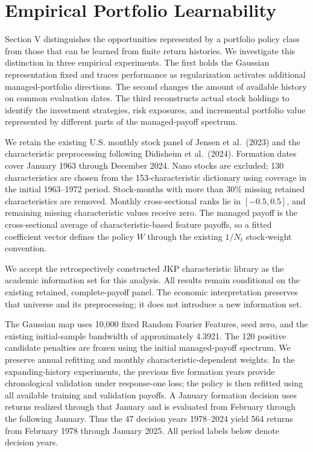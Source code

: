 \documentclass[12pt,letterpaper]{article}
\begin{document}
\section{Empirical Portfolio Learnability}

Section V distinguishes the opportunities represented by a portfolio policy class from those that can be learned from finite return histories. We investigate this distinction in three empirical experiments. The first holds the Gaussian representation fixed and traces performance as regularization activates additional managed-portfolio directions. The second changes the amount of available history on common evaluation dates. The third reconstructs actual stock holdings to identify the investment strategies, risk exposures, and incremental portfolio value represented by different parts of the managed-payoff spectrum.

We retain the existing U.S. monthly stock panel of Jensen et al.\ (2023) and the characteristic preprocessing following Didisheim et al.\ (2024). Formation dates cover January 1963 through December 2024. Nano stocks are excluded; 130 characteristics are chosen from the 153-characteristic dictionary using coverage in the initial 1963--1972 period. Stock-months with more than 30\% missing retained characteristics are removed. Monthly cross-sectional ranks lie in $[-0.5,0.5]$, and remaining missing characteristic values receive zero. The managed payoff is the cross-sectional average of characteristic-based feature payoffs, so a fitted coefficient vector defines the policy $W$ through the existing $1/N_t$ stock-weight convention.

We accept the retrospectively constructed JKP characteristic library as the academic information set for this analysis. All results remain conditional on the existing retained, complete-payoff panel. The economic interpretation preserves that universe and its preprocessing; it does not introduce a new information set.

The Gaussian map uses 10,000 fixed Random Fourier Features, seed zero, and the existing initial-sample bandwidth of approximately 4.3921. The 120 positive candidate penalties are frozen using the initial managed-payoff spectrum. We preserve annual refitting and monthly characteristic-dependent weights. In the expanding-history experiments, the previous five formation years provide chronological validation under response-one loss; the policy is then refitted using all available training and validation payoffs. A January formation decision uses returns realized through that January and is evaluated from February through the following January. Thus the 47 decision years 1978--2024 yield 564 returns from February 1978 through January 2025. All period labels below denote decision years.
\end{document}
